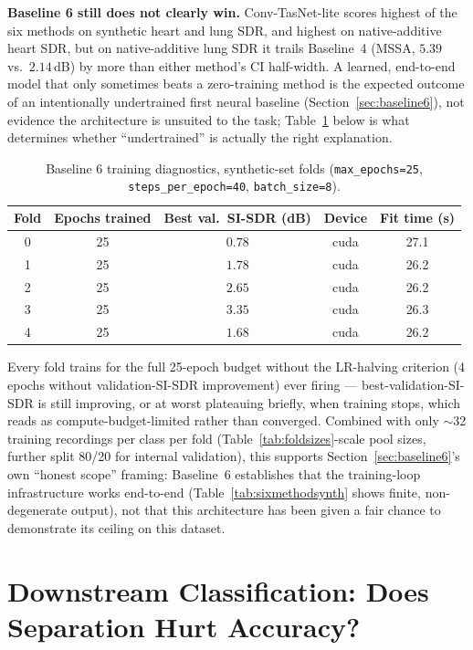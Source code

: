 \documentclass[11pt]{article}
\begin{document}
\textbf{Baseline 6 still does not clearly win.} Conv-TasNet-lite scores
highest of the six methods on synthetic heart and lung SDR, and highest on
native-additive heart SDR, but on native-additive lung SDR it trails
Baseline~4 (MSSA, $5.39$ vs.\ $2.14$\,dB) by more than either method's CI
half-width. A learned, end-to-end model that only sometimes beats a
zero-training method is the expected outcome of an intentionally
undertrained first neural baseline (Section~\ref{sec:baseline6}), not
evidence the architecture is unsuited to the task; Table~\ref{tab:b6diag}
below is what determines whether ``undertrained'' is actually the right
explanation.

\begin{table}[H]
\centering
\caption{Baseline 6 training diagnostics, synthetic-set folds (\texttt{max\_epochs=25}, \texttt{steps\_per\_epoch=40}, \texttt{batch\_size=8}).}
\label{tab:b6diag}
\begin{tabular}{@{}ccccc@{}}
\toprule
Fold & Epochs trained & Best val.\ SI-SDR (dB) & Device & Fit time (s) \\
\midrule
0 & 25 & $0.78$ & cuda & 27.1 \\
1 & 25 & $1.78$ & cuda & 26.2 \\
2 & 25 & $2.65$ & cuda & 26.2 \\
3 & 25 & $3.35$ & cuda & 26.3 \\
4 & 25 & $1.68$ & cuda & 26.2 \\
\bottomrule
\end{tabular}
\end{table}

Every fold trains for the full 25-epoch budget without the LR-halving
criterion (4 epochs without validation-SI-SDR improvement) ever firing ---
best-validation-SI-SDR is still improving, or at worst plateauing briefly,
when training stops, which reads as compute-budget-limited rather than
converged. Combined with only $\sim$32 training recordings per class per
fold (Table~\ref{tab:foldsizes}-scale pool sizes, further split 80/20 for
internal validation), this supports Section~\ref{sec:baseline6}'s own
``honest scope'' framing: Baseline~6 establishes that the training-loop
infrastructure works end-to-end (Table~\ref{tab:sixmethodsynth} shows finite,
non-degenerate output), not that this architecture has been given a fair
chance to demonstrate its ceiling on this dataset.

\section{Downstream Classification: Does Separation Hurt Accuracy?}
\label{sec:classifier}
\end{document}
